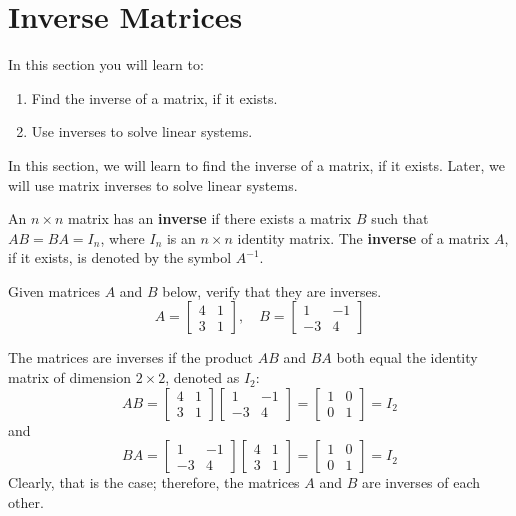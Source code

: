 \section{Inverse Matrices}
In this section you will learn to:
\begin{enumerate}
    \item Find the inverse of a matrix, if it exists.
    \item Use inverses to solve linear systems.
\end{enumerate}

In this section, we will learn to find the inverse of a matrix, if it exists. Later, we will use matrix inverses to solve linear systems.

\begin{definition}
    An \( n \times n \) matrix has an \textbf{inverse} if there exists a matrix \( B \) such that \( AB = BA = I_n \), where \( I_n \) is an \( n \times n \) identity matrix. The \textbf{inverse} of a matrix \( A \), if it exists, is denoted by the symbol \( A^{-1} \).
\end{definition}

\begin{example}
    Given matrices \( A \) and \( B \) below, verify that they are inverses.
    \[ A = \begin{bmatrix} 4 & 1 \\ 3 & 1 \end{bmatrix}, \quad B = \begin{bmatrix} 1 & -1 \\ -3 & 4 \end{bmatrix} \]
\end{example}
\begin{solution}
    The matrices are inverses if the product \( AB \) and \( BA \) both equal the identity matrix of dimension \( 2 \times 2 \), denoted as \( I_2 \):
    \[ AB = \begin{bmatrix} 4 & 1 \\ 3 & 1 \end{bmatrix} \begin{bmatrix} 1 & -1 \\ -3 & 4 \end{bmatrix} = \begin{bmatrix} 1 & 0 \\ 0 & 1 \end{bmatrix} = I_2 \]
    and
    \[ BA = \begin{bmatrix} 1 & -1 \\ -3 & 4 \end{bmatrix} \begin{bmatrix} 4 & 1 \\ 3 & 1 \end{bmatrix} = \begin{bmatrix} 1 & 0 \\ 0 & 1 \end{bmatrix} = I_2 \]
    Clearly, that is the case; therefore, the matrices \( A \) and \( B \) are inverses of each other.
\end{solution}

